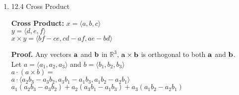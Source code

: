 \documentclass[11pt]{article}
\newcommand{\R}{\ensuremath{\mathbb R}}
\begin{document}
\begin{enumerate}
\item 12.4 Cross Product

\begin{center}
\textbf{Cross Product:} $x= \langle a,b,c \rangle$
\\
$y= \langle d,e,f \rangle$
\\
$x \times y = \langle bf-ce,cd-af,ae-bd \rangle$

\end{center}

\textbf{Proof.} Any vectors ${\bf a}$ and ${\bf b}$ in $\R^3$, ${\bf a} \times {\bf b}$ is orthogonal to both ${\bf a}$ and ${\bf b}$.
 \\
 Let $a=\langle a_1,a_2,a_3 \rangle$ and $b= \langle b_1, b_2, b_3 \rangle$
 \\
 $a \cdot (a \times b)=$
 \\
 $ a \cdot \langle a_2 b_3 - a_3 b_2, a_3 b_1 - a_1 b_3, a_1 b_2 - a_2 b_1 \rangle$
 \\
 $a_1(a_2 b_3 - a_3 b_2) + a_2 (a_3 b_1 - a_1 b_3) + a_3 (a_1 b_2 - a_2 b_1)$


\end{enumerate}
\end{document}
